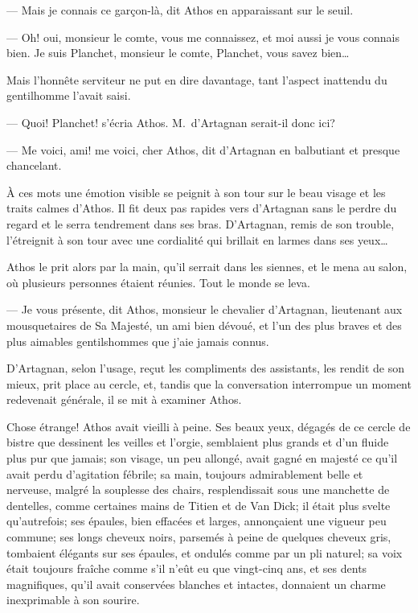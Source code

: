 — Mais je connais ce garçon-là, dit Athos en apparaissant sur le seuil.

— Oh! oui, monsieur le comte, vous me connaissez, et moi aussi je vous connais bien. Je suis Planchet, monsieur le comte, Planchet, vous savez bien\dots

Mais l'honnête serviteur ne put en dire davantage, tant l'aspect inattendu du gentilhomme l'avait saisi.

— Quoi! Planchet! s'écria Athos. M.~d'Artagnan serait-il donc ici?

— Me voici, ami! me voici, cher Athos, dit d'Artagnan en balbutiant et presque chancelant.

À ces mots une émotion visible se peignit à son tour sur le beau visage et les traits calmes d'Athos. Il fit deux pas rapides vers d'Artagnan sans le perdre du regard et le serra tendrement dans ses bras. D'Artagnan, remis de son trouble, l'étreignit à son tour avec une cordialité qui brillait en larmes dans ses yeux\dots

Athos le prit alors par la main, qu'il serrait dans les siennes, et le mena au salon, où plusieurs personnes étaient réunies. Tout le monde se leva.

— Je vous présente, dit Athos, monsieur le chevalier d'Artagnan, lieutenant aux mousquetaires de Sa Majesté, un ami bien dévoué, et l'un des plus braves et des plus aimables gentilshommes que j'aie jamais connus.

D'Artagnan, selon l'usage, reçut les compliments des assistants, les rendit de son mieux, prit place au cercle, et, tandis que la conversation interrompue un moment redevenait générale, il se mit à examiner Athos.

Chose étrange! Athos avait vieilli à peine. Ses beaux yeux, dégagés de ce cercle de bistre que dessinent les veilles et l'orgie, semblaient plus grands et d'un fluide plus pur que jamais; son visage, un peu allongé, avait gagné en majesté ce qu'il avait perdu d'agitation fébrile; sa main, toujours admirablement belle et nerveuse, malgré la souplesse des chairs, resplendissait sous une manchette de dentelles, comme certaines mains de Titien et de Van Dick; il était plus svelte qu'autrefois; ses épaules, bien effacées et larges, annonçaient une vigueur peu commune; ses longs cheveux noirs, parsemés à peine de quelques cheveux gris, tombaient élégants sur ses épaules, et ondulés comme par un pli naturel; sa voix était toujours fraîche comme s'il n'eût eu que vingt-cinq ans, et ses dents magnifiques, qu'il avait conservées blanches et intactes, donnaient un charme inexprimable à son sourire.

